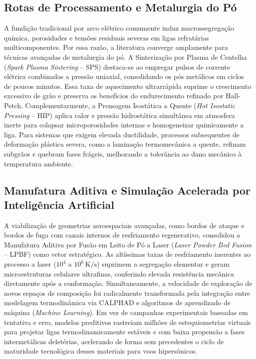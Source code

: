 \subsection{Rotas de Processamento e Metalurgia do Pó}\label{subsec:manufatura_avancada}

A fundição tradicional por arco elétrico comumente induz macrossegregação química, porosidades e tensões residuais severas em ligas refratárias multicomponentes. Por essa razão, a literatura converge amplamente para técnicas avançadas de metalurgia do pó. A Sinterização por Plasma de Centelha (\emph{Spark Plasma Sintering} -- SPS) destaca-se ao empregar pulsos de corrente elétrica combinados a pressão uniaxial, consolidando os pós metálicos em ciclos de poucos minutos. Essa taxa de aquecimento ultrarrápida suprime o crescimento excessivo de grão e preserva os benefícios do endurecimento refinado por Hall-Petch. Complementarmente, a Prensagem Isostática a Quente (\emph{Hot Isostatic Pressing} -- HIP) aplica calor e pressão hidrostática simultânea em atmosfera inerte para colapsar microporosidades internas e homogeneizar quimicamente a liga. Para sistemas que exigem elevada ductilidade, processos subsequentes de deformação plástica severa, como a laminação termomecânica a quente, refinam subgrãos e quebram fases frágeis, melhorando a tolerância ao dano mecânico à temperatura ambiente.

\subsection{Manufatura Aditiva e Simulação Acelerada por Inteligência Artificial}\label{subsec:impresao_3d_ia}

A viabilização de geometrias aeroespaciais avançadas, como bordos de ataque e bordos de fuga com canais internos de resfriamento regenerativo, consolidou a Manufatura Aditiva por Fusão em Leito de Pó a Laser (\emph{Laser Powder Bed Fusion} -- LPBF) como vetor estratégico. As altíssimas taxas de resfriamento inerentes ao processo a laser ($10^4$ a $10^6~\mathrm{K/s}$) suprimem a segregação elementar e geram microestruturas celulares ultrafinas, conferindo elevada resistência mecânica diretamente após a conformação. Simultaneamente, a velocidade de exploração de novos espaços de composição foi radicalmente transformada pela integração entre modelagem termodinâmica via CALPHAD e algoritmos de aprendizado de máquina (\emph{Machine Learning}). Em vez de campanhas experimentais baseadas em tentativa e erro, modelos preditivos rastreiam milhões de estequiometrias virtuais para projetar ligas termodinamicamente estáveis e com baixa propensão a fases intermetálicas deletérias, acelerando de forma sem precedentes o ciclo de maturidade tecnológica desses materiais para voos hipersônicos.
